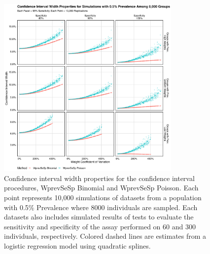 \documentclass[AMA,STIX1COL]{WileyNJD-v2}
\begin{document}
\begin{figure}
\centering
\includegraphics[width=0.8\textwidth]{figures/imperfect_confidence_interval_width_8000_groups_0_005_prev}
\caption{Confidence interval width properties for the confidence interval procedures, WprevSeSp Binomial and WprevSeSp Poisson.
Each point represents 10,000 simulations of datasets from a population with 0.5\% Prevalence where 8000 individuals are sampled.
Each datasets also includes simulated results of tests to evaluate the sensitivity and specificity of the assay performed on 60 and 300 individuals, respectively.
Colored dashed lines are estimates from a logistic regression model using quadratic splines.}
\label{fig:imperfect_confidence_interval_width_8000_groups_0_005_prev}
\end{figure}
\end{document}

